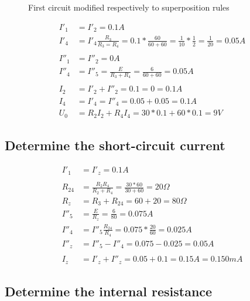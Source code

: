 \documentclass[]{scrartcl}
\begin{document}
\begin{figure}[H]
	\centering
	
	\caption{First circuit modified respectively to superposition rules}
	\label{fig:superposition_reference}
\end{figure}

\begin{equation}
\begin{aligned}
    I'_1&=I'_2=0.1A \\
    I'_4&=I'_4\frac{R_3}{R_3=R_4}=0.1*\frac{60}{60+60}=\frac{1}{10}*\frac{1}{2}=\frac{1}{20}=0.05A \\ \\
    I''_1&=I''_2=0A \\
    I''_4&=I''_5=\frac{E}{R_3+R_4}=\frac{6}{60+60}=0.05A \\ \\
    I_2&=I'_2+I''_2=0.1=0=0.1A \\
    I_4&=I'_4=I''_4=0.05+0.05=0.1A \\
    U_0&=R_2I_2+R_4I_4=30*0.1+60*0.1=9V
\end{aligned}
\end{equation}

\subsection{Determine the short-circuit current}

\begin{equation}
\begin{aligned}
    I'_1&=I'_z=0.1A \\ \\
    R_{24}&=\frac{R_2R_4}{R_2+R_4}=\frac{30*60}{30+60}=20\Omega \\
    R_z&=R_3+R_{24}=60+20=80\Omega \\
    I''_5&=\frac{E}{R_z}=\frac{6}{80}=0.075A \\
    I''_4&=I''_5\frac{R_{24}}{R_4}=0.075*\frac{20}{60}=0.025A \\
    I''_z&=I''_5-I''_4=0.075-0.025=0.05A \\ \\
    I_z&=I'_z+I''_z=0.05+0.1=0.15A=0.150mA
\end{aligned}    
\end{equation}

\subsection{Determine the internal resistance}
\end{document}
